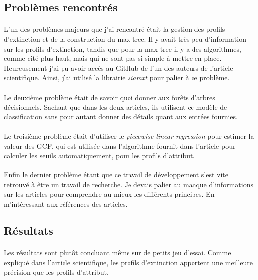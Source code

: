 \documentclass[paper=a4, 11pt]{article}
\begin{document}
\subsection{Problèmes rencontrés}
\paragraph{} L'un des problèmes majeurs que j'ai rencontré était la gestion des profils d'extinction et de la construction du max-tree. Il y avait très peu d'information sur les profils d'extinction, tandis que pour la max-tree il y a des algorithmes, comme cité plus haut, mais qui ne sont pas si simple à mettre en place. Heureusement j'ai pu avoir accès au GitHub de l'un des auteurs de l'article scientifique\cite{article1}. Ainsi, j'ai utilisé la librairie \textit{siamxt} pour palier à ce problème.

\paragraph{} Le deuxième problème était de savoir quoi donner aux forêts d'arbres décisionnels. Sachant que dans les deux articles, ils utilisent ce modèle de classification sans pour autant donner des détails quant aux entrées fournies.

\paragraph{} Le troisième problème était d'utiliser le \textit{piecewise linear regression} pour estimer la valeur des GCF, qui est utilisée dans l'algorithme fournit dans l'article\cite{article2} pour calculer les seuils automatiquement, pour les profils d'attribut.

\paragraph{} Enfin le dernier problème étant que ce travail de développement s'est vite retrouvé à être un travail de recherche. Je devais palier au manque d'informations sur les articles\cite{article1, article2} pour comprendre au mieux les différents principes. En m'intéressant aux références des articles.


\subsection{Résultats}
\paragraph{} Les résultats sont plutôt concluant même sur de petits jeu d'essai. Comme expliqué dans l'article scientifique\cite{article1}, les profils d'extinction apportent une meilleure précision que les profils d'attribut.
\end{document}
